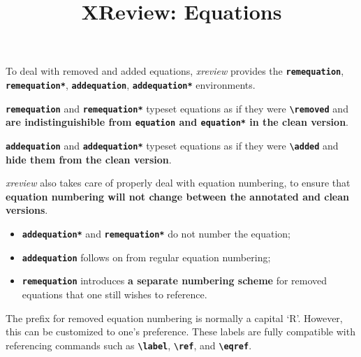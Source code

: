 \documentclass[10pt]{article}
\title{XReview: Equations}
\date{}
\newcommand{\writecommand}[1]{\texttt{\textbf{{\textbackslash#1}}}}
\newcommand{\writeenv}[1]{\texttt{\textbf{{#1}}}}
\begin{document}
\maketitle

To deal with removed and added equations, \textit{xreview} provides the \writeenv{remequation}, \writeenv{remequation*}, \writeenv{addequation}, \writeenv{addequation*} environments.

\writeenv{remequation} and \writeenv{remequation*} typeset equations as if they were \writecommand{removed} and \textbf{are indistinguishible from \writeenv{equation} and \writeenv{equation*} in the clean version}.

\writeenv{addequation} and \writeenv{addequation*} typeset equations as if they were \writecommand{added} and \textbf{hide them from the clean version}.

\textit{xreview} also takes care of properly deal with equation numbering, to ensure that \textbf{equation numbering will not change between the annotated and clean versions}.

\begin{itemize}
    \item \writeenv{addequation*} and \writeenv{remequation*} do not number the equation;
    \item \writeenv{addequation} follows on from regular equation numbering;
    \item \writeenv{remequation} introduces \textbf{a separate numbering scheme} for removed equations that one still wishes to reference.
\end{itemize}

The prefix for removed equation numbering is normally a capital `R'. However, this can be customized to one's preference. These labels are fully compatible with referencing commands such as \writecommand{label}, \writecommand{ref}, and \writecommand{eqref}.
\end{document}
